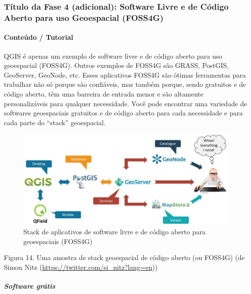 \documentclass[
]{book}
\begin{document}
\hypertarget{tuxedtulo-da-fase-4-adicional-software-livre-e-de-cuxf3digo-aberto-para-uso-geoespacial-foss4g}{%
\subsubsection{Título da Fase 4 (adicional): Software Livre e de Código Aberto para uso Geoespacial (FOSS4G)}\label{tuxedtulo-da-fase-4-adicional-software-livre-e-de-cuxf3digo-aberto-para-uso-geoespacial-foss4g}}

\hypertarget{conteuxfado-tutorial-3}{%
\paragraph{Conteúdo / Tutorial}\label{conteuxfado-tutorial-3}}

QGIS é apenas um exemplo de software livre e de código aberto para uso geoespacial (FOSS4G). Outros exemplos de FOSS4G são GRASS, PostGIS, GeoServer, GeoNode, etc. Esses aplicativos FOSS4G são ótimas ferramentas para trabalhar não só porque são confiáveis, mas também porque, sendo gratuitos e de código aberto, têm uma barreira de entrada menor e são altamente personalizáveis para qualquer necessidade. Você pode encontrar uma variedade de softwares geoespaciais gratuitos e de código aberto para cada necessidade e para cada parte do ``stack'' geoespacial.

\begin{figure}
\centering
\includegraphics{media/modulo0/foss4g-stack.jpeg}
\caption{Stack de aplicativos de software livre e de código aberto para geoespaciais (FOSS4G)}
\end{figure}

Figura 14. Uma amostra de stack geoespacial de código aberto (ou FOSS4G) (de Simon Nitz (\url{https://twitter.com/si_nitz?lang=en}))

\hypertarget{software-gruxe1tis}{%
\subparagraph{Software grátis}\label{software-gruxe1tis}}
\end{document}
